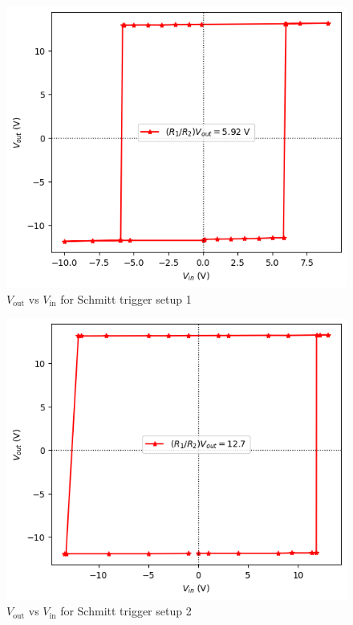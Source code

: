     \begin{figure}[H]
        \centering
        \includegraphics[width=1\columnwidth]{images/st5.png}
        \caption{$V_\text{out}$ vs $V_\text{in}$ for Schmitt trigger setup 1}
        \label{g4}
    \end{figure}
    \begin{figure}[H]
        \centering
        \includegraphics[width=1\columnwidth]{images/st12.png}
        \caption{$V_\text{out}$ vs $V_\text{in}$ for Schmitt trigger setup 2}
        \label{g5}
    \end{figure}